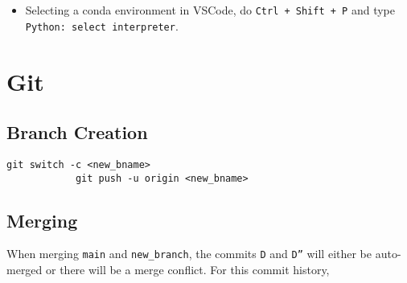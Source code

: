 \documentclass[12pt, a4paper]{scrbook}
\numberwithin{equation}{section}
\theoremstyle{definition}
\theoremstyle{definition}
\begin{document}
	\begin{itemize}
		\item Selecting a conda environment in VSCode, do \texttt{Ctrl + Shift + P} and type \newline \texttt{Python:~select interpreter}. 
	\end{itemize}
	
	\chapter{Git}
	
	\section{Branch Creation}
		
		\begin{lstlisting}[style=mystylebash, label=alg:git__branch_creation, xleftmargin=\parindent]
			git switch -c <new_bname>
			git push -u origin <new_bname>
		\end{lstlisting}
	
	\section{Merging}
		
		
		When merging \texttt{main} and \texttt{new\_branch}, the commits \texttt{D} and \texttt{D''} will either be auto-merged or there will be a merge conflict. For this commit history, 
		
\end{document}
